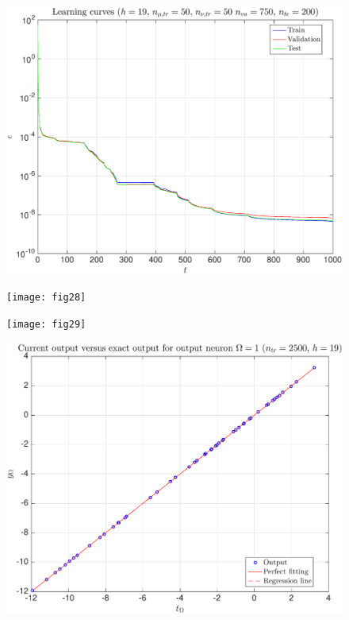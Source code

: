 \documentclass[11pt,a4paper]{article}
\theoremstyle{definition}
\theoremstyle{theorem}
\begin{document}
	\begin{figure}
		\center
		\includegraphics[scale=0.5]{fig27}
		\caption{}
	\end{figure}
	
	\begin{figure}
		\center
		\texttt{[image: fig28]}
		\caption{}
	\end{figure}
	
	\begin{figure}
		\center
		\texttt{[image: fig29]}
		\caption{}
	\end{figure}
	
	\begin{figure}
		\center
		\includegraphics[scale=0.5]{fig30}
		\caption{}
	\end{figure}
	
\end{document}
